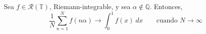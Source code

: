 \begin{corollary} 
    Sea $f \in \mathcal{R}(\mathbb{T})$, Riemann-integrable, y sea $\alpha \notin \mathbb{Q}$. Entonces, 
    \[
    \frac{1}{N} \sum_{n=1}^{N} f(n\alpha) \longrightarrow \int_0^1 f(x)\ dx \qquad \text{cuando } N \to \infty 
    \] 
\end{corollary}
